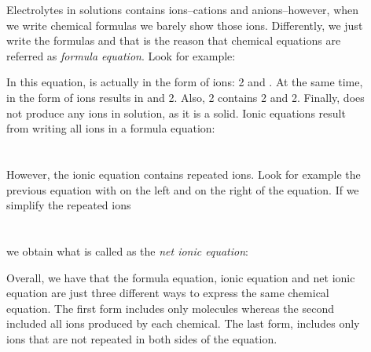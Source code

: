 \documentclass[main.tex]{subfiles}
\begin{document}
\begin{description}
\item[] Electrolytes in solutions contains ions--cations and anions--however, when we write chemical formulas we barely show those ions. Differently, we just write the formulas and that is the reason that chemical equations are referred as \emph{formula equation}. Look for example:
\begin{center}\end{center}
In this equation,  is actually in the form of ions: 2 and . At the same time,  in the form of ions results in  and 2. Also, 2 contains 2 and 2. Finally,  does not produce any ions in solution, as it is a solid.
Ionic equations result from writing all ions in a formula equation:
\\
{\raggedleft {} }  \\ 
\hspace*{\fill}
 \\
However, the ionic equation contains repeated ions. Look for example the previous equation with  on the left and on the right of the equation. If we simplify the repeated ions \\
{\raggedleft {} }  \\ 
\hspace*{\fill}
\\ 
we obtain what is called as the \emph{net ionic equation}:
\begin{center}  \end{center}
Overall, we have that the formula equation, ionic equation and net ionic equation are just three different ways to express the same chemical equation. The first form includes only molecules whereas the second included all ions produced by each chemical. The last form, includes only ions that are not repeated in both sides of the equation.


\end{description}
\end{document}
